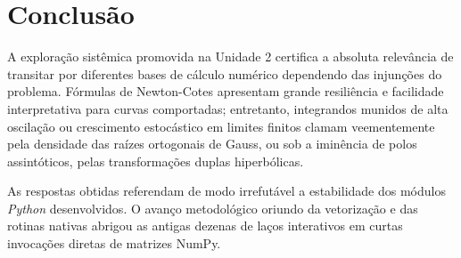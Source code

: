\documentclass[12pt,a4paper]{article}
\begin{document}
\section{Conclusão}
A exploração sistêmica promovida na Unidade 2 certifica a absoluta relevância de transitar por diferentes bases de cálculo numérico dependendo das injunções do problema. Fórmulas de Newton-Cotes apresentam grande resiliência e facilidade interpretativa para curvas comportadas; entretanto, integrandos munidos de alta oscilação ou crescimento estocástico em limites finitos clamam veementemente pela densidade das raízes ortogonais de Gauss, ou sob a iminência de polos assintóticos, pelas transformações duplas hiperbólicas.

As respostas obtidas referendam de modo irrefutável a estabilidade dos módulos \textit{Python} desenvolvidos. O avanço metodológico oriundo da vetorização e das rotinas nativas abrigou as antigas dezenas de laços interativos em curtas invocações diretas de matrizes NumPy.
\end{document}
